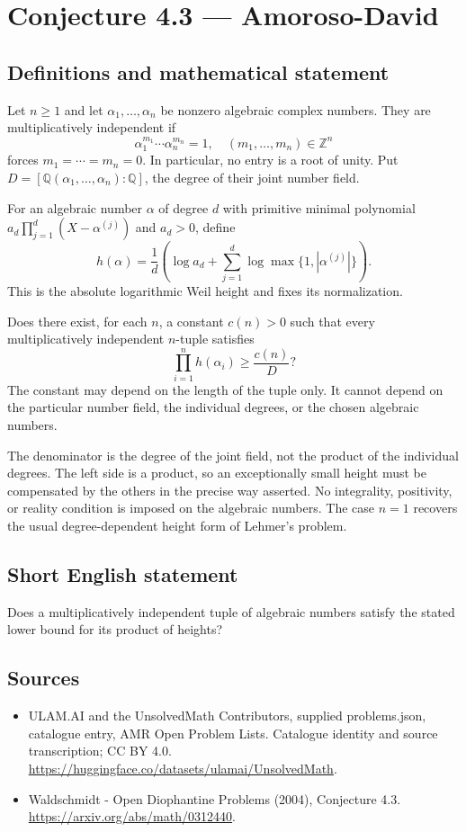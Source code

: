 \documentclass[11pt,a4paper]{article}
\begin{document}
\section*{Conjecture 4.3 — Amoroso-David}\label{statement}

\subsection{Definitions and mathematical statement}
Let $n\ge1$ and let $\alpha_1,\ldots,\alpha_n$ be nonzero algebraic complex numbers. They are multiplicatively independent if
\[
\alpha_1^{m_1}\cdots\alpha_n^{m_n}=1,\quad(m_1,\ldots,m_n)\in\mathbb Z^n
\]
forces $m_1=\cdots=m_n=0$. In particular, no entry is a root of unity. Put $D=[\mathbb Q(\alpha_1,\ldots,\alpha_n):\mathbb Q]$, the degree of their joint number field.

For an algebraic number $\alpha$ of degree $d$ with primitive minimal polynomial $a_d\prod_{j=1}^d(X-\alpha^{(j)})$ and $a_d>0$, define
\[
h(\alpha)=\frac1d\left(\log a_d+\sum_{j=1}^d
\log\max\{1,|\alpha^{(j)}|\}\right).
\]
This is the absolute logarithmic Weil height and fixes its normalization.

Does there exist, for each $n$, a constant $c(n)>0$ such that every multiplicatively independent $n$-tuple satisfies
\[
\prod_{i=1}^n h(\alpha_i)\ge\frac{c(n)}D?
\]
The constant may depend on the length of the tuple only. It cannot depend on the particular number field, the individual degrees, or the chosen algebraic numbers.

The denominator is the degree of the joint field, not the product of the individual degrees. The left side is a product, so an exceptionally small height must be compensated by the others in the precise way asserted. No integrality, positivity, or reality condition is imposed on the algebraic numbers. The case $n=1$ recovers the usual degree-dependent height form of Lehmer's problem.
\subsection{Short English statement}
Does a multiplicatively independent tuple of algebraic numbers satisfy the stated lower bound for its product of heights?
\subsection{Sources}
\begin{itemize}
\item[S1] ULAM.AI and the UnsolvedMath Contributors, supplied problems.json, catalogue entry, AMR Open Problem Lists. Catalogue identity and source transcription; CC BY 4.0.
\url{https://huggingface.co/datasets/ulamai/UnsolvedMath}.
\item[S2] Waldschmidt - Open Diophantine Problems (2004), Conjecture 4.3. 
\url{https://arxiv.org/abs/math/0312440}.
\end{itemize}
\end{document}
